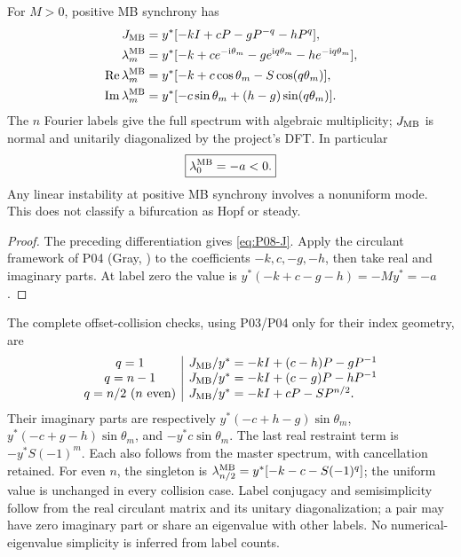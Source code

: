 \begin{theorem}
\label{thm:P08-spectrum}
For $M>0$, positive MB synchrony has
\begin{align}
 J_{\mathrm{MB}}&=y^*[-kI+cP-gP^{-q}-hP^q],\label{eq:P08-J}\\
 \lambda_m^{\mathrm{MB}}&=y^*[-k+ce^{-\mathrm{i}\theta_m}-ge^{\mathrm{i} q\theta_m}
                           -he^{-\mathrm{i} q\theta_m}],\label{eq:P08-spectrum}\\
 \operatorname{Re}\lambda_m^{\mathrm{MB}}&=y^*[-k+c\cos\theta_m-S\cos(q\theta_m)],
 \label{eq:P08-real}\\
 \operatorname{Im}\lambda_m^{\mathrm{MB}}&=y^*[-c\sin\theta_m+(h-g)\sin(q\theta_m)].
 \label{eq:P08-imag}
\end{align}
The $n$ Fourier labels give the full spectrum with algebraic multiplicity;
$J_{\mathrm{MB}}$ is normal and unitarily diagonalized by the project's DFT.
In particular
\begin{equation}
 \boxed{\lambda_0^{\mathrm{MB}}=-a<0.}\label{eq:P08-uniform}
\end{equation}
Any linear instability at positive MB synchrony involves a nonuniform
mode. This does not classify a bifurcation as Hopf or steady.
\end{theorem}
\begin{proof}
The preceding differentiation gives \eqref{eq:P08-J}. Apply the
circulant framework of P04 (Gray, \cite[Theorem~3.1]{Gray2006})
to the coefficients $-k,c,-g,-h$, then take real and imaginary parts.
At label zero the value is $y^*(-k+c-g-h)=-My^*=-a$.
\end{proof}

The complete offset-collision checks, using P03/P04 only for their
index geometry, are
\[
\begin{array}{c|l}
q=1&J_{\mathrm{MB}}/y^*=-kI+(c-h)P-gP^{-1}\\
q=n-1&J_{\mathrm{MB}}/y^*=-kI+(c-g)P-hP^{-1}\\
q=n/2\ (n\text{ even})&J_{\mathrm{MB}}/y^*=-kI+cP-SP^{n/2}.
\end{array}
\]
Their imaginary parts are respectively
$y^*(-c+h-g)\sin\theta_m$, $y^*(-c+g-h)\sin\theta_m$, and
$-y^*c\sin\theta_m$. The last real restraint term is $-y^*S(-1)^m$.
Each also follows from the master spectrum, with cancellation retained.
For even $n$, the singleton is
$\lambda_{n/2}^{\mathrm{MB}}=y^*[-k-c-S(-1)^q]$; the uniform value is
unchanged in every collision case. Label conjugacy and semisimplicity
follow from the real circulant matrix and its unitary diagonalization;
a pair may have zero imaginary part or share an eigenvalue with other
labels. No numerical-eigenvalue simplicity is inferred from label counts.

